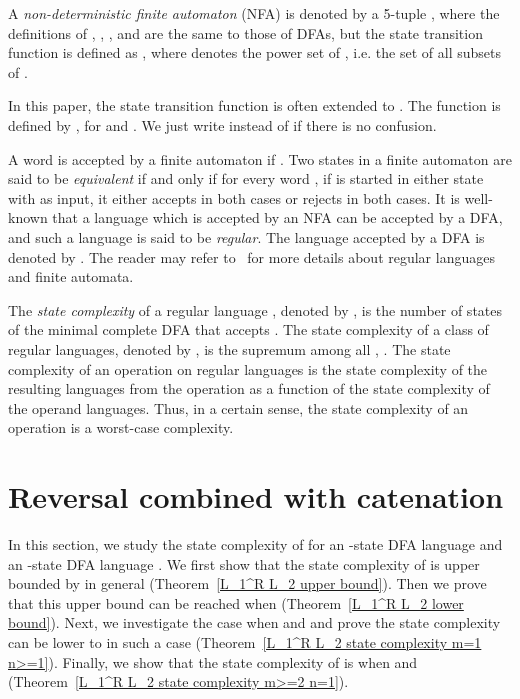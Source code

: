 \documentclass[10pt]{article}
\begin{document}
A {\it non-deterministic finite automaton} (NFA) is denoted by a 5-tuple , where the definitions of , , , and  are the same to those of DFAs, but the state transition function  is defined as , where  denotes the power set of , i.e. the set of all subsets of .

In this paper, the state transition function  is often extended to . The function  is defined by , for  and .
We just write  instead of  if there is no confusion.

A word  is accepted by a finite automaton if .
Two states in a finite automaton  are said to be {\it equivalent} if and only if for every word , if  is started in either state with  as input, it either accepts in both cases or rejects in both cases.
It is well-known that a language which is accepted by
an NFA can be accepted by a DFA, and such a language is said to be {\it regular}.
The language accepted by a DFA  is denoted by .
The reader may refer to~\cite{HoMoUl01,Yu97} for more
details about regular languages and finite automata.

The {\it state complexity} of a regular language , denoted by
, is the number of states of the minimal complete DFA that
accepts . The state complexity of a class  of regular
languages, denoted by , is the supremum among all , . The state complexity of an operation on regular languages is
the state complexity of the resulting languages from the operation as a function of the state complexity of the operand languages.
Thus, in a certain sense, the state complexity of an operation is a worst-case complexity.

\section{Reversal combined with catenation}\label{sec:rev-cat}
In this section, we study the state complexity of  for an
-state DFA language  and an -state DFA language . We
first show that the state complexity of  is upper bounded
by  in general (Theorem~\ref{L_1^R L_2 upper
bound}). Then we prove that this upper bound can be reached when
 (Theorem~\ref{L_1^R L_2 lower bound}). Next, we
investigate the case when  and  and prove the state
complexity can be lower to  in such a case
(Theorem~\ref{L_1^R L_2 state complexity m=1 n>=1}). Finally, we
show that the state complexity of  is  when  and  (Theorem~\ref{L_1^R L_2 state complexity m>=2
n=1}).
\end{document}
